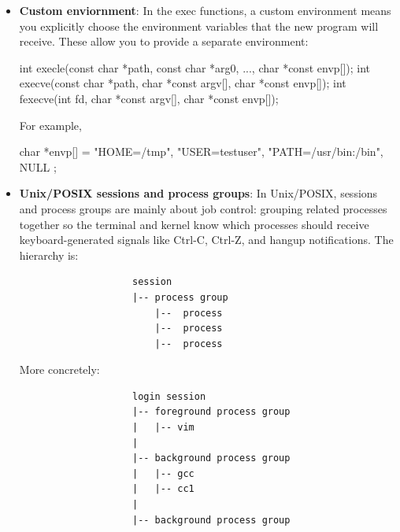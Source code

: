 \documentclass{report}
\begin{document}
\begin{itemize}
\begin{cppcode}
                    /* Write bytes from a buffer to a file descriptor. */
                    ssize_t write(int fd, const void *buf, size_t count);
                \end{cppcode}
            \item \textbf{Custom enviornment}: In the exec functions, a custom environment means you explicitly choose the environment variables that the new program will receive.
                \bigbreak \noindent 
                These allow you to provide a separate environment:
                \bigbreak \noindent 
                \begin{cppcode}
                    int execle(const char *path, const char *arg0, ..., char *const envp[]);
                    int execve(const char *path, char *const argv[], char *const envp[]);
                    int fexecve(int fd, char *const argv[], char *const envp[]);
                \end{cppcode}
                \bigbreak \noindent 
                For example,
                \bigbreak \noindent 
                \begin{cppcode}
                    char *envp[] = {
                        "HOME=/tmp",
                        "USER=testuser",
                        "PATH=/usr/bin:/bin",
                        NULL
                    };
                \end{cppcode}
            \item \textbf{Unix/POSIX sessions and process groups}: In Unix/POSIX, sessions and process groups are mainly about job control: grouping related processes together so the terminal and kernel know which processes should receive keyboard-generated signals like Ctrl-C, Ctrl-Z, and hangup notifications.
                \bigbreak \noindent 
                The hierarchy is:
                \begin{verbatim}
                    session
                    |-- process group
                        |--  process
                        |--  process
                        |--  process
                \end{verbatim}
                More concretely:
                \begin{verbatim}
                    login session
                    |-- foreground process group
                    |   |-- vim
                    |
                    |-- background process group
                    |   |-- gcc
                    |   |-- cc1
                    |
                    |-- background process group

\end{verbatim}
\end{itemize}
\end{document}
